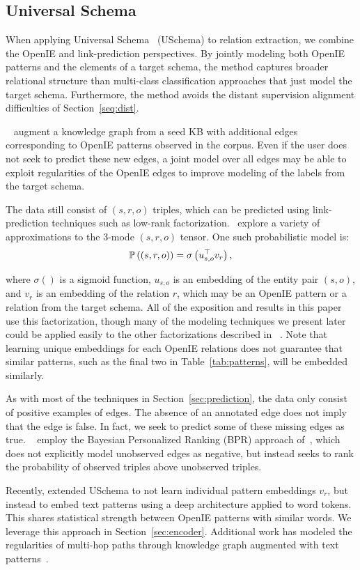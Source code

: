 \subsection{Universal Schema}
When applying Universal Schema~\citep{limin} (USchema) to relation extraction, we combine the OpenIE and link-prediction perspectives.  By jointly modeling both OpenIE patterns and the elements of a target schema, the method captures broader relational structure than multi-class classification approaches that just model the target schema. Furthermore, the method avoids the distant supervision alignment difficulties of Section~\ref{seq:dist}. 

~\citet{limin} augment a knowledge graph from a seed KB with additional edges corresponding to OpenIE patterns observed in the corpus. Even if the user does not seek to predict these new edges, a joint model over all edges may be able to exploit regularities of the OpenIE edges to improve modeling of the labels from the target schema. 

The data still consist of $(s,r,o)$ triples, which can be predicted using link-prediction techniques such as low-rank factorization.~\citet{limin} explore a variety of approximations to the 3-mode $(s,r,o)$ tensor. One such probabilistic model is:
\begin{equation}
\mathbb{P} \left((s,r,o)\right) = \sigma\left( u_{s,o}^\top v_r \right), \label{eq:US-prob}
\end{equation}

where  $\sigma()$ is a sigmoid function, $u_{s,o}$ is an embedding of the entity pair $(s,o)$, and $v_r$ is an embedding of the relation $r$, which may be an OpenIE pattern or a relation from the target schema. All of the exposition and results in this paper use this factorization, though many of the modeling techniques we present later could be applied easily to the other factorizations described in ~\citet{limin}. Note that learning unique embeddings for each OpenIE relations does not guarantee that similar patterns, such as the final two in Table~\ref{tab:patterns}, will be embedded similarly.

As with most of the techniques in Section~\ref{sec:prediction}, the data only consist of positive examples of edges. The absence of an annotated edge does not imply that the edge is false. In fact, we seek to predict some of these missing edges as true. ~\citet{limin} employ the Bayesian Personalized Ranking (BPR) approach of~\citet{rendle2009bpr}, which does not explicitly model unobserved edges as negative, but instead seeks to rank the probability of observed triples above unobserved triples.


Recently, \citet{toutanova2015representing} extended USchema to not learn individual pattern embeddings $v_r$, but instead to embed text patterns using a deep architecture applied to word tokens. This shares statistical strength between OpenIE patterns with similar words. We leverage this approach in Section~\ref{sec:encoder}. Additional work has modeled the regularities of multi-hop paths through knowledge graph augmented with text patterns~\citep{pra,pra_second,vector_pra,neelakantan2015compositional}.



